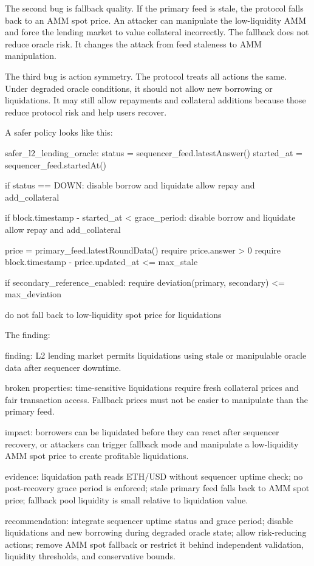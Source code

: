 The second bug is fallback quality. If the primary feed is stale, the protocol falls back to an AMM spot price. An attacker can manipulate the low-liquidity AMM and force the lending market to value collateral incorrectly. The fallback does not reduce oracle risk. It changes the attack from feed staleness to AMM manipulation.

The third bug is action symmetry. The protocol treats all actions the same. Under degraded oracle conditions, it should not allow new borrowing or liquidations. It may still allow repayments and collateral additions because those reduce protocol risk and help users recover.

A safer policy looks like this:

\begin{codeblock}
safer_l2_lending_oracle:
    status = sequencer_feed.latestAnswer()
    started_at = sequencer_feed.startedAt()

    if status == DOWN:
        disable borrow and liquidate
        allow repay and add_collateral

    if block.timestamp - started_at < grace_period:
        disable borrow and liquidate
        allow repay and add_collateral

    price = primary_feed.latestRoundData()
    require price.answer > 0
    require block.timestamp - price.updated_at <= max_stale

    if secondary_reference_enabled:
        require deviation(primary, secondary) <= max_deviation

    do not fall back to low-liquidity spot price for liquidations
\end{codeblock}

The finding:

\begin{codeblock}
finding:
    L2 lending market permits liquidations using stale or manipulable
    oracle data after sequencer downtime.

broken properties:
    time-sensitive liquidations require fresh collateral prices and fair
    transaction access. Fallback prices must not be easier to manipulate
    than the primary feed.

impact:
    borrowers can be liquidated before they can react after sequencer
    recovery, or attackers can trigger fallback mode and manipulate a
    low-liquidity AMM spot price to create profitable liquidations.

evidence:
    liquidation path reads ETH/USD without sequencer uptime check;
    no post-recovery grace period is enforced;
    stale primary feed falls back to AMM spot price;
    fallback pool liquidity is small relative to liquidation value.

recommendation:
    integrate sequencer uptime status and grace period; disable liquidations
    and new borrowing during degraded oracle state; allow risk-reducing
    actions; remove AMM spot fallback or restrict it behind independent
    validation, liquidity thresholds, and conservative bounds.
\end{codeblock}

